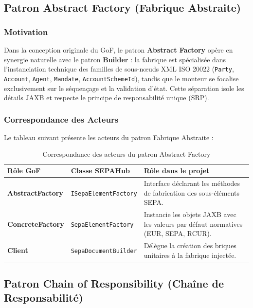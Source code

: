 \documentclass[12pt,a4paper]{article}
\begin{document}
\newpage

\subsection{Patron Abstract Factory (Fabrique Abstraite)}

\subsubsection{Motivation}
Dans la conception originale du GoF, le patron \textbf{Abstract Factory} opère en synergie naturelle avec le patron \textbf{Builder} : la fabrique est spécialisée dans l'instanciation technique des familles de sous-nœuds XML ISO 20022 (\texttt{Party}, \texttt{Account}, \texttt{Agent}, \texttt{Mandate}, \texttt{AccountSchemeId}), tandis que le monteur se focalise exclusivement sur le séquençage et la validation d'état. Cette séparation isole les détails JAXB et respecte le principe de responsabilité unique (SRP).

\subsubsection{Correspondance des Acteurs}
Le tableau suivant présente les acteurs du patron Fabrique Abstraite :

\begin{table}[H]
    \centering
    \small
    \begin{tabularx}{\textwidth}{|l|p{4.2cm}|Y|}
        \hline
        \textbf{Rôle GoF} & \textbf{Classe SEPAHub} & \textbf{Rôle dans le projet} \\
        \hline
        \textbf{AbstractFactory} & \texttt{ISepaElementFactory} & Interface déclarant les méthodes de fabrication des sous-éléments SEPA. \\
        \hline
        \textbf{ConcreteFactory} & \texttt{SepaElementFactory} & Instancie les objets JAXB avec les valeurs par défaut normatives (EUR, SEPA, RCUR). \\
        \hline
        \textbf{Client} & \texttt{SepaDocumentBuilder} & Délègue la création des briques unitaires à la fabrique injectée. \\
        \hline
    \end{tabularx}
    \caption{Correspondance des acteurs du patron Abstract Factory}
\end{table}

\newpage

\subsection{Patron Chain of Responsibility (Chaîne de Responsabilité)}
\end{document}
